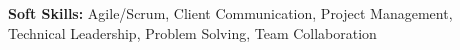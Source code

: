 \textbf{Soft Skills:} Agile/Scrum, Client Communication, Project Management, Technical Leadership, Problem Solving, Team Collaboration
